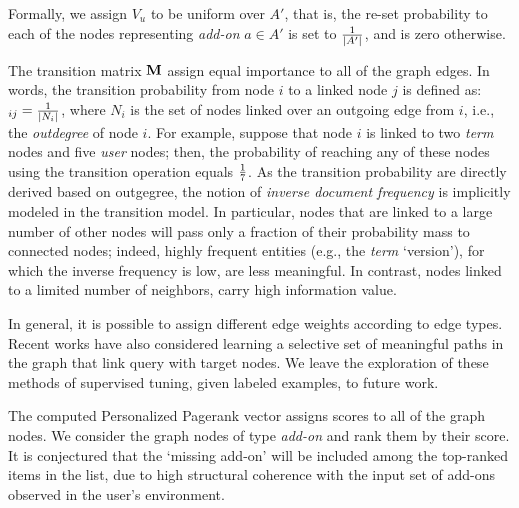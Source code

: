 \documentclass[11pt,oneside]{book}
\newcommand{\transition}{{\bf M}}
\begin{document}
Formally, we assign $V_u$ to be uniform over $A'$, that is, the re-set
probability to each of the nodes representing {\it add-on} $a\in A'$
is set to ${1 \over \mid A' \mid}$, and is zero otherwise.

The transition matrix $\transition$ assign equal importance to all of
the graph edges. In words, the transition probability from node $i$ to
a linked node $j$ is defined as: $_{ij}={1 \over \mid N_i \mid}$,
where $N_i$ is the set of nodes linked over an outgoing edge from $i$,
i.e., the {\it outdegree} of node $i$. For example, suppose that node
$i$ is linked to two {\it term} nodes and five {\it user} nodes; then,
the probability of reaching any of these nodes using the transition
operation equals ${1\over 7}$. As the transition probability are
  directly derived based on outgegree, the notion of {\it inverse
    document frequency} is implicitly modeled in the transition
  model. In particular, nodes that are linked to a large number of
  other nodes will pass only a fraction of their probability mass to
  connected nodes; indeed, highly frequent entities (e.g., the {\it
    term} `version'), for which the inverse frequency is low, are less
  meaningful. In contrast, nodes linked to a limited number of
  neighbors, carry high information value. 

In general, it is possible to assign different edge weights according
to edge types. Recent works have also considered learning a selective
set of meaningful paths in the graph that link query with target
nodes. We leave the exploration of these methods of supervised tuning,
given labeled examples, to future work. 

The computed Personalized Pagerank vector assigns scores to all of the
graph nodes. We consider the graph nodes of type {\it add-on} and rank
them by their score. It is conjectured that the `missing add-on' will
be included among the top-ranked items in the list, due to high
structural coherence with the input set of add-ons observed in the
user's environment.
\end{document}
